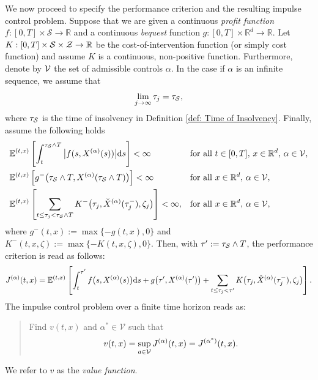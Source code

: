 We now proceed to specify the performance criterion and the resulting impulse control problem. Suppose that we are given a continuous \emph{profit function} $f: [0,T] \times \mathcal{S} \rightarrow \mathbb R$ and a continuous \emph{bequest} function $g: [0,T] \times \mathbb R^d \rightarrow \mathbb R$. Let $K: [0,T] \times \mathcal{S} \times \mathcal Z \rightarrow \mathbb{R}$ be the cost-of-intervention function (or simply cost function) and assume $K$ is a continuous, non-positive function. Furthermore, denote by $\mathcal{V}$ the set of admissible controls $\alpha$. In the case if $\alpha$ is an infinite sequence, we assume that
\begin{equation}
    \lim_{j \rightarrow \infty} \tau_j = \tau_{\mathcal{S}},
    \label{eqn: lim of tau_j}
\end{equation}
where $\tau_{\mathcal{S}}$ is the time of insolvency in Definition \ref{def: Time of Insolvency}. Finally, assume the following holds
\begin{align}
    & \mathbb{E}^{(t,x)}\left[\int_t^{\tau_{\mathcal{S}} \wedge T} \big| f(s,X^{(\alpha)}(s))\big| \mathrm{d} s \right] < \infty && \text{for all } t \in [0,T], \, x \in \mathbb{R}^d,\, \alpha \in \mathcal{V},
    \label{eqn: well-behavedness of f} \\
    & \mathbb{E}^{(t,x)}\left[ g^-\big(\tau_{\mathcal{S}} \wedge T, X^{(\alpha)} (\tau_{\mathcal{S}} \wedge T)\big) \right] < \infty && \text{for all } x \in \mathbb{R}^d, \, \alpha \in \mathcal{V}, 
    \label{eqn: well-behavedness of g} \\
    & \mathbb{E}^{(t,x)} \left[ \sum_{t \leq \tau_j < \tau_{\mathcal{S}} \wedge T} K^-\big(\tau_j,\check{X}^{(\alpha)}(\tau_j^-), \zeta_j\big) \right] < \infty, && \text{for all } x \in \mathbb{R}^d, \, \alpha \in \mathcal{V},
    \label{eqn: well-behavedness of K}
\end{align}
where $g^-(t,x) := \max\{-g(t,x), 0\}$ and $K^-(t,x,\zeta) := \max\{-K(t,x, \zeta), 0\}$. Then, with $\tau' := \tau_{\mathcal{S}} \wedge T$, the performance criterion is read as follows:
\begin{equation}
    J^{(\alpha)}(t,x) = \mathbb{E}^{(t,x)} \left[ \int_t^{\tau'} f\big(s,X^{(\alpha)}(s)\big) \mathrm{d} s + g\big(\tau', X^{(\alpha)}(\tau')\big) + \sum_{t \leq \tau_j < \tau'} K\big(\tau_j, \check{X}^{(\alpha)}(\tau_j^-), \zeta_j\big) \right].
    \label{eqn: performance criterion}
\end{equation}
The impulse control problem over a finite time horizon reads as:
\begin{quote}
    Find $v(t,x)$ and $\alpha^* \in \mathcal V$ such that 
    \begin{equation}
        v(t,x) = \sup_{a \in \mathcal{V}}J^{(\alpha)}(t,x) = J^{(\alpha^*)}(t,x).
        \label{eqn: optimal value function}
    \end{equation}
\end{quote}
We refer to $v$ as the \emph{value function}. 

